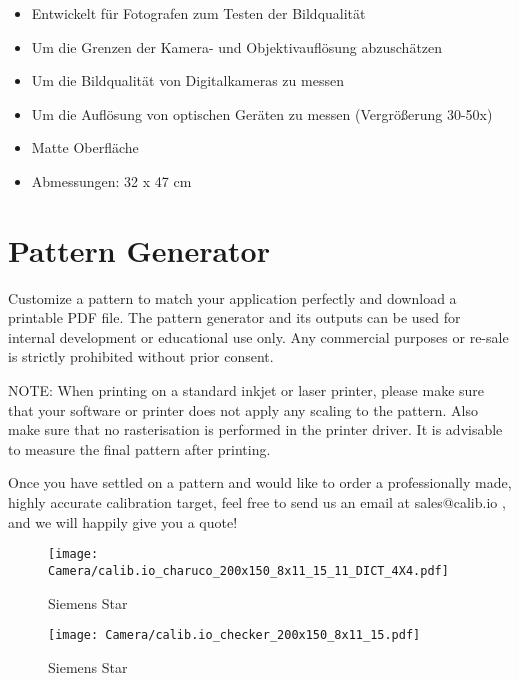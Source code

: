 \begin{itemize}
  \item Entwickelt für Fotografen zum Testen der Bildqualität
  \item Um die Grenzen der Kamera- und Objektivauflösung abzuschätzen
  \item Um die Bildqualität von Digitalkameras zu messen
  \item Um die Auflösung von optischen Geräten zu messen (Vergrößerung 30-50x)
  \item Matte Oberfläche
  \item Abmessungen: 32 x 47 cm
\end{itemize}


\section{Pattern Generator}





Customize a pattern to match your application perfectly and download a printable PDF file. The pattern generator and its outputs can be used for internal development or educational use only. Any commercial purposes or re-sale is strictly prohibited without prior consent. 

NOTE: When printing on a standard inkjet or laser printer, please make sure that your software or printer does not apply any scaling to the pattern. Also make sure that no rasterisation is performed in the printer driver. It is advisable to measure the final pattern after printing.

Once you have settled on a pattern and would like to order a professionally made, highly accurate calibration target, feel free to send us an email at sales@calib.io , and we will happily give you a quote!


\begin{figure}
    \begin{center}
        \texttt{[image: Camera/calib.io\_charuco\_200x150\_8x11\_15\_11\_DICT\_4X4.pdf]}
        
        \caption{Siemens Star}
    \end{center}    
\end{figure}


\begin{figure}
    \begin{center}
        \texttt{[image: Camera/calib.io\_checker\_200x150\_8x11\_15.pdf]}
        
        \caption{Siemens Star}
    \end{center}    
\end{figure}


